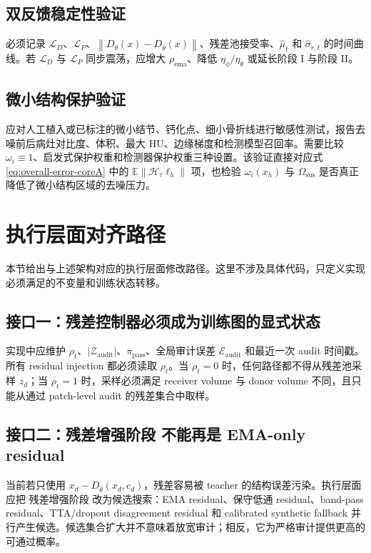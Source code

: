 \documentclass[11pt,a4paper,UTF8,fontset=fandol]{ctexart}
\theoremstyle{definition}
\newcommand{\norm}[1]{\left\lVert#1\right\rVert}
\newcommand{\E}{\mathbb{E}}
\newcommand{\cL}{\mathcal{L}}
\newcommand{\cH}{\mathcal{H}}
\newcommand{\cZ}{\mathcal{Z}}
\begin{document}
\subsection{双反馈稳定性验证}

必须记录 $\cL_D$、$\cL_P$、$\norm{D_\theta(x)-D_{\bar\theta}(x)}$、残差池接受率、$\hat\mu_t$ 和 $\hat\sigma_{r,t}$ 的时间曲线。若 $\cL_D$ 与 $\cL_P$ 同步震荡，应增大 $\rho_{\mathrm{ema}}$、降低 $\eta_\phi/\eta_\theta$ 或延长阶段 I 与阶段 II。

\subsection{微小结构保护验证}

应对人工植入或已标注的微小结节、钙化点、细小骨折线进行敏感性测试，报告去噪前后病灶对比度、体积、最大 HU、边缘梯度和检测模型召回率。需要比较 $\omega_i\equiv1$、启发式保护权重和检测器保护权重三种设置。该验证直接对应式 \eqref{eq:overall-error-coreA} 中的 $\E\norm{\cH_\tau\ell_h}$ 项，也检验 $\omega_i(x_h)$ 与 $\Omega_{\mathrm{sus}}$ 是否真正降低了微小结构区域的去噪压力。






\section{执行层面对齐路径}

本节给出与上述架构对应的执行层面修改路径。这里不涉及具体代码，只定义实现必须满足的不变量和训练状态转移。

\subsection{接口一：残差控制器必须成为训练图的显式状态}

实现中应维护 $\rho_t$、$|\cZ_{\mathrm{audit}}|$、$\pi_{\mathrm{pass}}$、全局审计误差 $\mathcal E_{\mathrm{audit}}$ 和最近一次 audit 时间戳。所有 residual injection 都必须读取 $\rho_t$。当 $\rho_t=0$ 时，任何路径都不得从残差池采样 $z_d$；当 $\rho_t=1$ 时，采样必须满足 receiver volume 与 donor volume 不同，且只能从通过 patch-level audit 的残差集合中取样。

\subsection{接口二：残差增强阶段 不能再是 EMA-only residual}

当前若只使用 $x_d-D_{\bar\theta}(x_d,c_d)$，残差容易被 teacher 的结构误差污染。执行层面应把 残差增强阶段 改为候选搜索：EMA residual、保守低通 residual、band-pass residual、TTA/dropout disagreement residual 和 calibrated synthetic fallback 并行产生候选。候选集合扩大并不意味着放宽审计；相反，它为严格审计提供更高的可通过概率。
\end{document}
